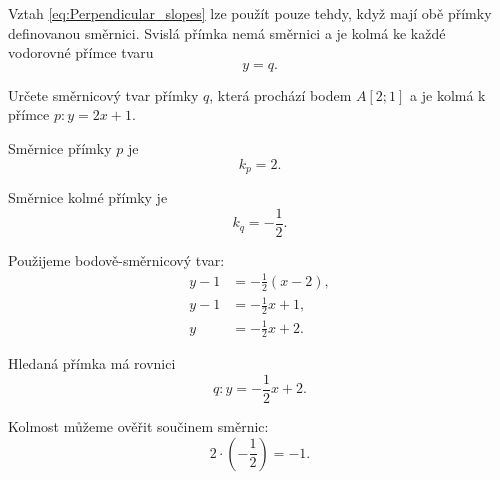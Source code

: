 \begin{remark}\label{rem:Vertical_horizontal_perpendicular_lines}
    Vztah \eqref{eq:Perpendicular_slopes} lze použít pouze tehdy,
    když mají obě přímky definovanou směrnici. Svislá přímka nemá
    směrnici a je kolmá ke každé vodorovné přímce tvaru
    \[
        y=q.
    \]
\end{remark}

\begin{example}\label{exa:Perpendicular_line_slope_intercept}
    Určete směrnicový tvar přímky $q$, která prochází bodem $A[2;1]$ a je kolmá k přímce $p:y=2x+1$.

    Směrnice přímky $p$ je
    \[
        k_p=2.
    \]

    Směrnice kolmé přímky je
    \[
        k_q=-\frac{1}{2}.
    \]

    Použijeme bodově-směrnicový tvar:
    \begin{align*}
        y-1
        &=
        -\frac{1}{2}(x-2),\\
        y-1
        &=
        -\frac{1}{2}x+1,\\
        y
        &=
        -\frac{1}{2}x+2.
    \end{align*}

    Hledaná přímka má rovnici
    \[
        q:y=-\frac{1}{2}x+2.
    \]

    Kolmost můžeme ověřit součinem směrnic:
    \[
        2\cdot\left(-\frac{1}{2}\right)=-1.
    \]
\end{example}